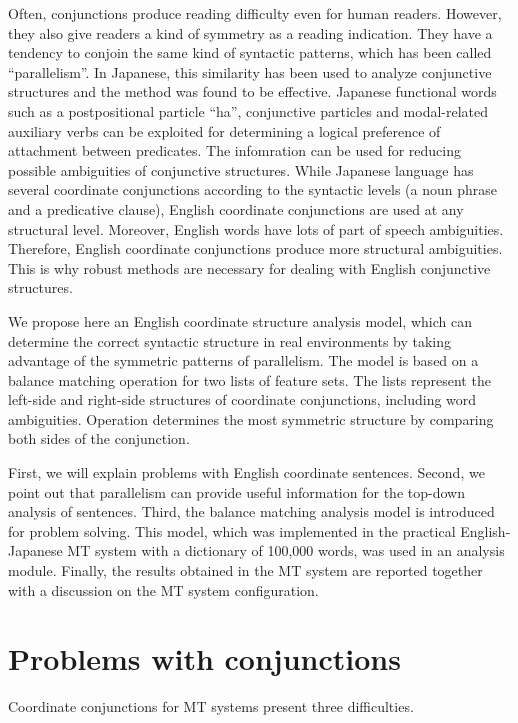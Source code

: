 Often, conjunctions produce reading difficulty even for human readers.
However, they also give readers a kind of symmetry as a reading
indication.  They have a tendency to conjoin the same kind of
syntactic patterns, which has been called
``parallelism''\cite{Beaugrande81,Shinoda91}.  In Japanese, this
similarity has been used to analyze conjunctive structures and the
method was found to be effective\cite{Kurohashi92}.
Japanese functional words such as a postpositional particle
``ha'', conjunctive particles and modal-related auxiliary verbs can be
exploited for determining a logical preference of attachment between
predicates\cite{KM86,FS90,Doi91}. The infomration can be used for
reducing possible ambiguities of conjunctive structures.
While Japanese
language has several coordinate conjunctions according to the
syntactic levels (a noun phrase and a predicative clause), English
coordinate conjunctions are used at any structural level. 
Moreover, English words have lots of part of speech ambiguities.
Therefore, English coordinate conjunctions produce more structural
ambiguities.
This is why robust methods are necessary for dealing with English
conjunctive structures.
    
We propose here an English coordinate structure analysis model, which
can determine the correct syntactic structure in real environments by
taking advantage of the symmetric patterns of parallelism.
The model is based on a balance matching operation for two lists of
feature sets. The lists represent the left-side and right-side
structures of coordinate conjunctions, including word ambiguities.
Operation determines the most symmetric
structure by comparing both sides of the conjunction.

First, we will explain problems with English coordinate sentences.
Second, we point out that parallelism can provide useful information
for the top-down analysis of sentences.  Third, the balance
matching analysis model is introduced for problem solving.
This model, which was implemented in the practical English-Japanese MT system
with a dictionary of 100,000 words, was used in an analysis module.
Finally, the results obtained in the MT system are reported together with
a discussion on the MT system configuration. 

\section{Problems with conjunctions}

Coordinate conjunctions for MT systems present three
difficulties\cite{Kosy86,Huang83,Niimi86,Okumura87}.

